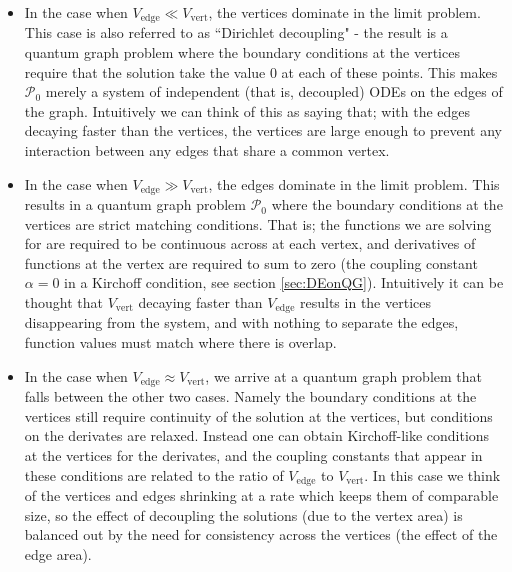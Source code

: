 \begin{itemize}
	\item In the case when $V_{\mathrm{edge}} \ll V_{\mathrm{vert}}$, the vertices dominate in the limit problem.
	This case is also referred to as ``Dirichlet decoupling" - the result is a quantum graph problem where the boundary conditions at the vertices require that the solution take the value 0 at each of these points.
	This makes $\mathcal{P}_0$ merely a system of independent (that is, decoupled) ODEs on the edges of the graph.
	Intuitively we can think of this as saying that; with the edges decaying faster than the vertices, the vertices are large enough to prevent any interaction between any edges that share a common vertex.
	\item In the case when $V_{\mathrm{edge}} \gg V_{\mathrm{vert}}$, the edges dominate in the limit problem.
	This results in a quantum graph problem $\mathcal{P}_0$ where the boundary conditions at the vertices  are strict matching conditions.
	That is; the functions we are solving for are required to be continuous across at each vertex, and derivatives of functions at the vertex are required to sum to zero (the coupling constant $\alpha=0$ in a Kirchoff condition, see section \ref{sec:DEonQG}).
	Intuitively it can be thought that $V_{\mathrm{vert}}$ decaying faster than $V_{\mathrm{edge}}$ results in the vertices disappearing from the system, and with nothing to separate the edges, function values must match where there is overlap.
	\item In the case when $V_{\mathrm{edge}} \approx V_{\mathrm{vert}}$, we arrive at a quantum graph problem that falls between the other two cases.
	Namely the boundary conditions at the vertices still require continuity of the solution at the vertices, but conditions on the derivates are relaxed.
	Instead one can obtain Kirchoff-like conditions at the vertices for the derivates, and the coupling constants that appear in these conditions are related to the ratio of $V_{\mathrm{edge}}$ to $V_{\mathrm{vert}}$.
	In this case we think of the vertices and edges shrinking at a rate which keeps them of comparable size, so the effect of decoupling the solutions (due to the vertex area) is balanced out by the need for consistency across the vertices (the effect of the edge area).
\end{itemize}

